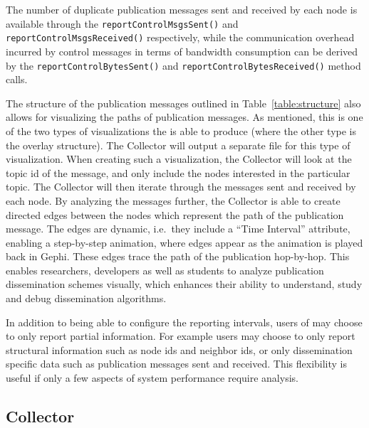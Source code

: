 The number of duplicate publication messages sent and received by each
node is available through the \texttt{reportControlMsgsSent()}  and
\texttt{reportControlMsgsReceived()} respectively, while the communication
overhead incurred by control messages in terms of bandwidth consumption can be
derived by the \texttt{reportControlBytesSent()} and
\texttt{reportControlBytesReceived()} method calls.



The structure of the publication messages outlined in
Table~\ref{table:structure} also allows for visualizing the paths of
publication messages. As mentioned, this is one of the two types of
visualizations the \demo{} is able to produce (where the other type is
the overlay structure). The Collector will output a separate \gexf{}
file for this type of visualization. When creating such a visualization,
the Collector will look at the topic id of the message, and only include
the nodes interested in the particular topic. The Collector will then
iterate through the messages sent and received by each node. By
analyzing the messages further, the Collector is able to create directed
edges between the nodes which represent the path of the publication
message. The edges are dynamic, i.e.\ they include a ``Time Interval''
attribute, enabling a step-by-step animation, where edges appear as the
animation is played back in Gephi. These edges trace
the path of the publication hop-by-hop. This enables researchers,
developers as well as students to analyze publication dissemination
schemes visually, which enhances their ability to understand, study and
debug dissemination algorithms.

In addition to being able to configure the reporting intervals, users of
\demo{} may choose to only report partial information. For example users
may choose to only report structural information such as node ids and
neighbor ids, or only dissemination specific data such as publication
messages sent and received. This flexibility is useful if only a few
aspects of system performance require analysis.

\subsection{Collector}
\label{sec:collector}

